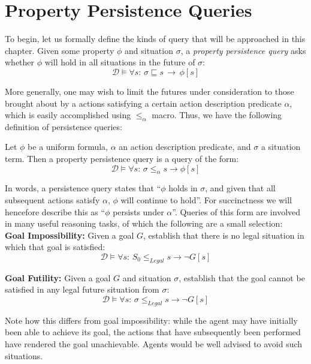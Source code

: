 \section{Property Persistence Queries\label{sec:Persistence:Definitions}}

To begin, let us formally define the kinds of query that will be approached
in this chapter. Given some property $\phi$ and situation $\sigma$,
a \emph{property persistence query} asks whether $\phi$ will hold
in all situations in the future of $\sigma$: \[
\mathcal{D}\models\forall s:\,\sigma\sqsubseteq s\,\rightarrow\,\phi[s]\]


More generally, one may wish to limit the futures under consideration
to those brought about by a actions satisfying a certain action description
predicate $\alpha$, which is easily accomplished using $\leq_{\alpha}$
macro. Thus, we have the following definition of persistence queries:

\begin{defnL}
 Let $\phi$ be a uniform
formula, $\alpha$ an action description predicate, and $\sigma$
a situation term. Then a property persistence query is a query of
the form:\[
\mathcal{D}\models\forall s:\,\sigma\le_{\alpha}s\rightarrow\phi[s]\]

\end{defnL}
In words, a persistence query states that {}``$\phi$ holds in $\sigma$,
and given that all subsequent actions satisfy $\alpha$, $\phi$ will
continue to hold''. For succinctness we will hencefore describe this
as {}``$\phi$ persists under $\alpha$''. Queries of this form
are involved in many useful reasoning tasks, of which the following
are a small selection:\\


\textbf{Goal Impossibility:} Given a goal $G$, establish that there
is no legal situation in which that goal is satisfied:\[
\mathcal{D}\models\forall s:\, S_{0}\leq_{Legal}s\rightarrow\neg G[s]\]


\textbf{Goal Futility:} Given a goal $G$ and situation $\sigma$,
establish that the goal cannot be satisfied in any legal future situation
from $\sigma$:\[
\mathcal{D}\models\forall s:\,\sigma\leq_{Legal}s\rightarrow\neg G[s]\]


Note how this differs from goal impossibility: while the agent may
have initially been able to achieve its goal, the actions that have
subsequently been performed have rendered the goal unachievable. Agents
would be well advised to avoid such situations.\\


